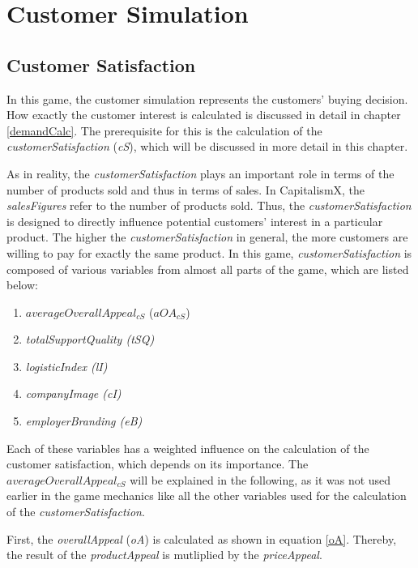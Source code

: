 \section{Customer Simulation} 
\label{sec:customsim}

\subsection{Customer Satisfaction}
\label{customerSatisfaction}
In this game, the customer simulation represents the customers' buying decision. How exactly the customer interest is calculated is discussed in detail in chapter \ref{demandCalc}. The prerequisite for this is the calculation of the \textit{customerSatisfaction} (\textit{\gls{cS}}), which will be discussed in more detail in this chapter.

As in reality, the \textit{customerSatisfaction} plays an important role in terms of the number of products sold and thus in terms of sales. \cite{deptolla_effects_2004} In CapitalismX, the \textit{salesFigures} refer to the number of products sold.
Thus, the \textit{customerSatisfaction} is designed to directly influence potential customers' interest in a particular product. The higher the \textit{customerSatisfaction} in general, the more customers are willing to pay for exactly the same product. 
In this game, \textit{customerSatisfaction} is composed of various variables from almost all parts of the game, which are listed below:
\begin{enumerate}
      \item $averageOverallAppeal_{cS}$ ($aOA_{cS}$)
      \item \textit{totalSupportQuality (tSQ)}
      \item \textit{logisticIndex (lI)}
      \item \textit{companyImage (cI)}
      \item \textit{employerBranding (eB)}
\end{enumerate}
Each of these variables has a weighted influence on the calculation of the customer satisfaction, which depends on its importance.
The $averageOverallAppeal_{cS} $ will be explained in the following, as it was not used earlier in the game mechanics like all the other variables used for the calculation of the \textit{customerSatisfaction}.

First, the \textit{overallAppeal} (\textit{\gls{oA}}) is calculated as shown in equation \ref{oA}. Thereby, the result of the \textit{productAppeal} is mutliplied by the \textit{priceAppeal}. 

